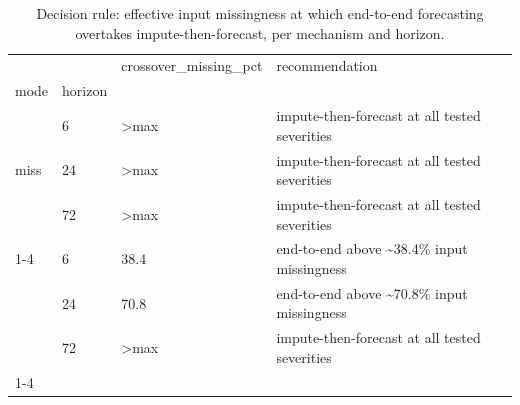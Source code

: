 \begin{table}
\caption{Decision rule: effective input missingness at which end-to-end forecasting overtakes impute-then-forecast, per mechanism and horizon.}
\label{tab:decision}
\begin{tabular}{llll}
\toprule
 &  & crossover\_missing\_pct & recommendation \\
mode & horizon &  &  \\
\midrule
\multirow[t]{3}{*}{miss} & 6 & >max & impute-then-forecast at all tested severities \\
 & 24 & >max & impute-then-forecast at all tested severities \\
 & 72 & >max & impute-then-forecast at all tested severities \\
\cline{1-4}
\multirow[t]{3}{*}{out} & 6 & 38.4 & end-to-end above \textasciitilde 38.4\% input missingness \\
 & 24 & 70.8 & end-to-end above \textasciitilde 70.8\% input missingness \\
 & 72 & >max & impute-then-forecast at all tested severities \\
\cline{1-4}
\bottomrule
\end{tabular}
\end{table}
